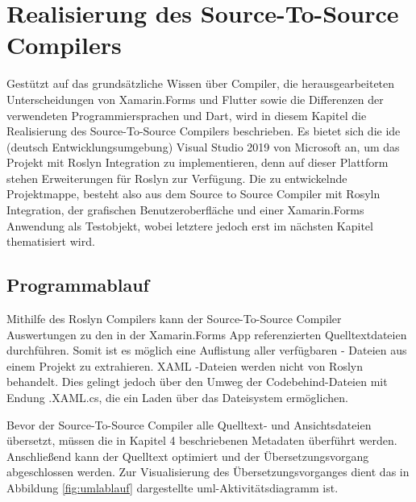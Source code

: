 \chapter{Realisierung des Source-To-Source Compilers}
\label{chap:Realisierung}
Gestützt auf das grundsätzliche Wissen über Compiler, die herausgearbeiteten Unterscheidungen von  Xamarin.Forms und Flutter sowie die Differenzen der verwendeten Programmiersprachen  \Csharp und Dart, wird in diesem Kapitel die Realisierung des Source-To-Source Compilers beschrieben.  Es bietet sich die \ac{ide} (deutsch Entwicklungsumgebung) Visual Studio 2019 von Microsoft an,  um das Projekt mit Roslyn Integration zu implementieren,  denn auf dieser Plattform stehen Erweiterungen für Roslyn zur Verfügung.
Die zu entwickelnde Projektmappe,  besteht also aus dem Source to Source Compiler mit Rosyln Integration, der grafischen Benutzeroberfläche und einer Xamarin.Forms
Anwendung als Testobjekt,  wobei letztere jedoch erst im nächsten Kapitel thematisiert wird.


\section{Programmablauf}
Mithilfe des Roslyn Compilers kann der Source-To-Source Compiler Auswertungen zu den in der Xamarin.Forms App referenzierten Quelltextdateien durchführen.  Somit ist es
möglich eine Auflistung aller verfügbaren \Csharp - Dateien aus einem Projekt zu extrahieren.  XAML -Dateien werden nicht von Roslyn behandelt.  Dies gelingt jedoch über den Umweg der Codebehind-Dateien mit Endung .XAML.cs,  die ein Laden über das Dateisystem ermöglichen. 

Bevor der Source-To-Source Compiler alle Quelltext- und Ansichtsdateien übersetzt,  müssen die in Kapitel 4 beschriebenen Metadaten überführt werden.  Anschließend kann der Quelltext optimiert und der Übersetzungsvorgang abgeschlossen werden.  Zur Visualisierung des Übersetzungsvorganges dient das in Abbildung \ref{fig:umlablauf} dargestellte \ac{uml}-Aktivitätsdiagramm ist.

